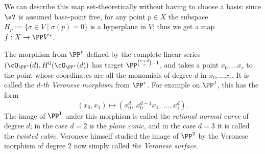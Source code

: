 We can describe this map set-theoretically without having to choose a basis: since $\sV$ is assumed base-point free, for any point $p \in X$ the subspace $H_p := \{ \sigma \in V \mid \sigma(p) = 0 \}$ is a hyperplane in $V$; thus we get a map $f : X \to \PP V^*$.


%
%
%
%

\begin{example}\label{Veronese definition}
The morphism from $\PP^r$ defined by the complete linear series $(\cO_{\PP^r}(d), H^0(\cO_{\PP^r}(d))$ has target
$\PP^{{r+d\choose r}-1}$, and takes a point $x_0,\dots x_r$ to the point whose coordinates are all the monomials of
degree $d$ in $x_0,\dots x_r$. It is called the \emph{$d$-th Veronese morphism} from $\PP^r$. For example on $\PP^1$, this has the form
$$
(x_0,x_1) \mapsto (x_0^d,\ x_0^{d-1}x_1,\ \dots,x_1^d).
$$
The image of $\PP^1$ under this morphism is called the \emph{rational normal curve} of degree $d$; in the case $d=2$ is the
\emph{plane conic}, and in the case $d=3$ it is called the \emph{twisted cubic}. Veronese himself studied the image of $\PP^2$
by the Veronese morphism of degree 2 now simply called \emph{the Veronese surface}.
\end{example}






